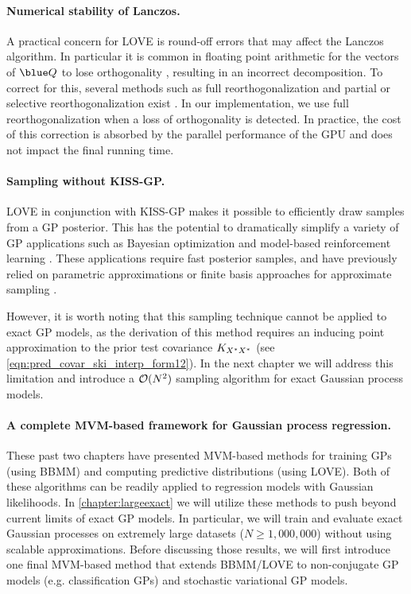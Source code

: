 \paragraph{Numerical stability of Lanczos.}
A practical concern for LOVE{} is round-off errors that may affect the Lanczos algorithm.
In particular it is common in floating point arithmetic for the vectors of $\blue \bQ$ to lose orthogonality \cite{paige1970practical,simon1984lanczos,golub2012matrix}, resulting in an incorrect decomposition.
To correct for this, several methods such as full reorthogonalization and partial or selective reorthogonalization exist \cite{golub2012matrix}.
In our implementation, we use full reorthogonalization when a loss of orthogonality is detected.
In practice, the cost of this correction is absorbed by the parallel performance of the GPU and does not impact the final running time.


\paragraph{Sampling without KISS-GP.}
LOVE in conjunction with KISS-GP makes it possible to efficiently draw samples from a GP posterior.
This has the potential to dramatically simplify a variety of GP applications such as Bayesian optimization and model-based reinforcement learning \citep[e.g.,][]{deisenroth2011pilco,hernandez2014predictive,wang2017max}.
These applications require fast posterior samples, and have previously relied on parametric approximations or finite basis approaches for approximate sampling \citep[e.g.,][]{deisenroth2011pilco,wang2017max}.

However, it is worth noting that this sampling technique cannot be applied to exact GP models,
as the derivation of this method requires an inducing point approximation to the prior test covariance $K_{X^*X^*}$ (see \cref{eqn:pred_covar_ski_interp_form12}).
In the next chapter we will address this limitation and introduce a $\bigo{N^2}$ sampling algorithm for exact Gaussian process models.

\paragraph{A complete MVM-based framework for Gaussian process regression.}
These past two chapters have presented MVM-based methods for training GPs (using BBMM) and computing predictive distributions (using LOVE).
Both of these algorithms can be readily applied to regression models with Gaussian likelihoods.
In \cref{chapter:largeexact} we will utilize these methods to push beyond current limits of exact GP models.
In particular, we will train and evaluate exact Gaussian processes on extremely large datasets ($N \geq 1,\!000,\!000$) without using scalable approximations.
Before discussing those results, we will first introduce one final MVM-based method that extends BBMM/LOVE to non-conjugate GP models (e.g. classification GPs) and stochastic variational GP models.
